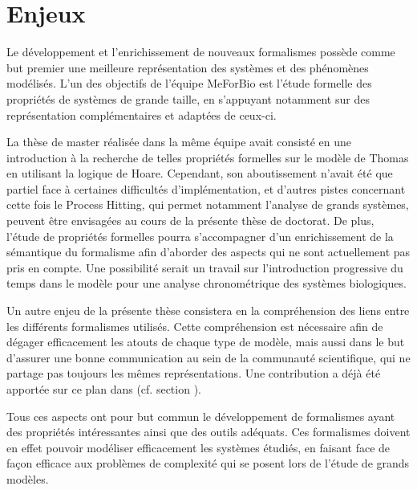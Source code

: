 \section{Enjeux}


Le développement et l'enrichissement de nouveaux formalismes possède comme but premier une meilleure représentation des systèmes et des phénomènes modélisés.
L'un des objectifs de l'équipe MeForBio est l'étude formelle des propriétés de systèmes de grande taille,
en s'appuyant notamment sur des représentation complémentaires et adaptées de ceux-ci.

La thèse de master \cite{Folschette2011} réalisée dans la même équipe avait consisté en une introduction à la recherche de telles propriétés formelles sur le modèle de Thomas en utilisant la logique de Hoare.
Cependant, son aboutissement n'avait été que partiel face à certaines difficultés d'implémentation,
et d'autres pistes concernant cette fois le Process Hitting, qui permet notamment l'analyse de grands systèmes, peuvent être envisagées au cours de la présente thèse de doctorat.
De plus, l'étude de propriétés formelles pourra s'accompagner d'un enrichissement de la sémantique du formalisme afin d'aborder des aspects qui ne sont actuellement pas pris en compte.
Une possibilité serait un travail sur l'introduction progressive du temps dans le modèle pour une analyse chronométrique des systèmes biologiques.


Un autre enjeu de la présente thèse consistera en la compréhension des liens entre les différents formalismes utilisés.
Cette compréhension est nécessaire afin de dégager efficacement les atouts de chaque type de modèle,
mais aussi dans le but d'assurer une bonne communication au sein de la communauté scientifique, qui ne partage pas toujours les mêmes représentations.
Une contribution a déjà été apportée sur ce plan dans \cite{FPIMR12-CMSB} (cf. section ).

Tous ces aspects ont pour but commun le développement de formalismes ayant des propriétés intéressantes ainsi que des outils adéquats.
Ces formalismes doivent en effet pouvoir modéliser efficacement les systèmes étudiés,
en faisant face de façon efficace aux problèmes de complexité qui se posent lors de l'étude de grands modèles.
